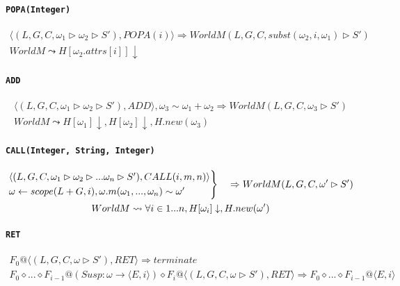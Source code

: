 \documentclass[]{article}
\numberwithin{equation}{section}
\numberwithin{figure}{section}
\numberwithin{table}{section}
\begin{document}
\paragraph{\texttt{POPA(Integer)}}\label{popainteger}

\begin{gather*}
  \langle (L, G, C, \omega_1 \rhd \omega_2 \rhd S'), POPA(i)\rangle \Rightarrow WorldM (L, G, C, subst(\omega_2, i, \omega_1) \rhd S' )\\
  WorldM \leadsto H[\omega_2.attrs[i]] \downarrow
\end{gather*}

\paragraph{\texttt{ADD}}\label{add}

\begin{gather*}
  \langle (L, G, C, \omega_1 \rhd \omega_2 \rhd S'), ADD\rangle, \omega_3 \sim \omega_1 + \omega_2 \Rightarrow WorldM (L, G, C, \omega_3 \rhd S')\\
  WorldM \leadsto H[\omega_1] \downarrow, H[\omega_2] \downarrow, H.new(\omega_3)
\end{gather*}

\paragraph{\texttt{CALL(Integer, String, Integer)}}\label{callinteger-string-integer}

\begin{gather*}
  \begin{rcases}
    \langle (L, G, C, \omega_1 \rhd \omega_2 \rhd ... \omega_n \rhd S'), CALL(i, m, n)\rangle\\
    \omega \leftarrow scope(L + G, i), \omega.m(\omega_1, ..., \omega_n) \sim \omega'
  \end{rcases}
  \quad
    \Rightarrow WorldM (L, G, C, \omega' \rhd S' )\\
  WorldM \leadsto \forall i \in 1...n, H[\omega_i] \downarrow, H.new(\omega')
\end{gather*}

\paragraph{\texttt{RET}}\label{ret}

\begin{gather*}
  F_0@\langle (L, G, C, \omega \rhd S'), RET\rangle \Rightarrow terminate \\
  F_0 \diamond ... \diamond F_{i - 1}@(Susp: \omega \rightarrow \langle E, i \rangle)\diamond F_i@\langle (L, G, C, \omega \rhd S'), RET\rangle \Rightarrow F_0 \diamond ... \diamond F_{i-1}@ \langle E, i \rangle
\end{gather*}
\end{document}
